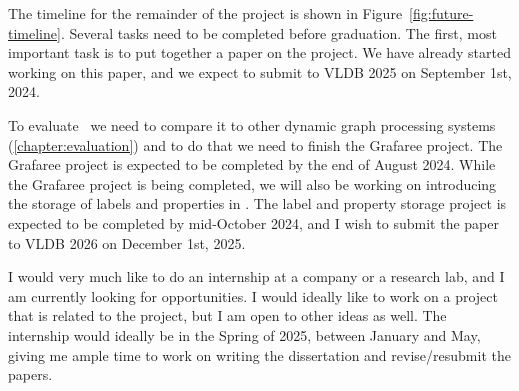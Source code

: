 


\label{sec:future-timeline}
The timeline for the remainder of the project is shown in Figure~\ref{fig:future-timeline}.
Several tasks need to be completed before graduation.
The first, most important task is to put together a paper on the \project{} project.
We have already started working on this paper, and we expect to submit to VLDB 2025 on September 1st, 2024.

To evaluate~\project{} we need to compare it to other dynamic graph processing systems (\autoref{chapter:evaluation}) and to do that we need to finish the Grafaree project.
The Grafaree project is expected to be completed by the end of August 2024. 
While the Grafaree project is being completed, we will also be working on introducing the storage of labels and properties in \project{}.
The label and property storage project is expected to be completed by mid-October 2024, and I wish to submit the paper to VLDB 2026 on December 1st, 2025.

I would very much like to do an internship at a company or a research lab, and I am currently looking for opportunities.
I would ideally like to work on a project that is related to the \project{} project, but I am open to other ideas as well.
The internship would ideally be in the Spring of 2025, between January and May, giving me ample time to work on writing the dissertation and revise/resubmit the papers.

